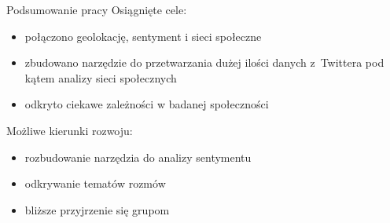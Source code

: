 \documentclass[xcolor=table]{beamer}
\begin{document}
\appendix
\begin{frame}{Podsumowanie pracy}
Osiągnięte cele:
\begin{itemize}
\item połączono geolokację, sentyment i sieci społeczne
\item zbudowano narzędzie do przetwarzania dużej ilości danych z~Twittera pod
kątem analizy sieci społecznych
\item odkryto ciekawe zależności w badanej społeczności
\end{itemize}
\vspace{0.5cm}
Możliwe kierunki rozwoju:
\begin{itemize}
\item rozbudowanie narzędzia do analizy sentymentu
\item odkrywanie tematów rozmów
\item bliższe przyjrzenie się grupom
\end{itemize} 
 
\end{frame} 
 
\end{document}

